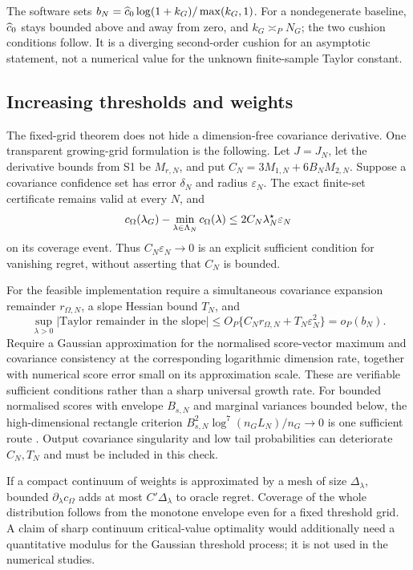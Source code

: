 The software sets $b_N=\widehat c_0\log(1+k_G)/\max(k_G,1)$. For a nondegenerate baseline, $\widehat c_0$ stays bounded above and away from zero, and $k_G\asymp_P N_G$; the two cushion conditions follow. It is a diverging second-order cushion for an asymptotic statement, not a numerical value for the unknown finite-sample Taylor constant.

\subsection{Increasing thresholds and weights}
The fixed-grid theorem does not hide a dimension-free covariance derivative. One transparent growing-grid formulation is the following. Let $J=J_N$, let the derivative bounds from S1 be $M_{r,N}$, and put $C_N=3M_{1,N}+6B_NM_{2,N}$. Suppose a covariance confidence set has error $\delta_N$ and radius $\varepsilon_N$. The exact finite-set certificate remains valid at every $N$, and
\[
 c_\Omega(\lambda_G)-\min_{\lambda\in\Lambda_N}c_\Omega(\lambda)
 \leq2C_N\lambda_N^\star\varepsilon_N
\]
on its coverage event. Thus $C_N\varepsilon_N\to0$ is an explicit sufficient condition for vanishing regret, without asserting that $C_N$ is bounded.

For the feasible implementation require a simultaneous covariance expansion remainder $r_{\Omega,N}$, a slope Hessian bound $T_N$, and
\[
 \sup_{\lambda>0}|\text{Taylor remainder in the slope}|
 \leq O_P\{C_Nr_{\Omega,N}+T_N\varepsilon_N^2\}=o_P(b_N).
\]
Require a Gaussian approximation for the normalised score-vector maximum and covariance consistency at the corresponding logarithmic dimension rate, together with numerical score error small on its approximation scale. These are verifiable sufficient conditions rather than a sharp universal growth rate. For bounded normalised scores with envelope $B_{s,N}$ and marginal variances bounded below, the high-dimensional rectangle criterion $B_{s,N}^2\log^7(n_GL_N)/n_G\to0$ is one sufficient route \citep{cck2016clt}. Output covariance singularity and low tail probabilities can deteriorate $C_N,T_N$ and must be included in this check.

If a compact continuum of weights is approximated by a mesh of size $\Delta_\lambda$, bounded $\partial_\lambda c_\Omega$ adds at most $C'\Delta_\lambda$ to oracle regret. Coverage of the whole distribution follows from the monotone envelope even for a fixed threshold grid. A claim of sharp continuum critical-value optimality would additionally need a quantitative modulus for the Gaussian threshold process; it is not used in the numerical studies.


